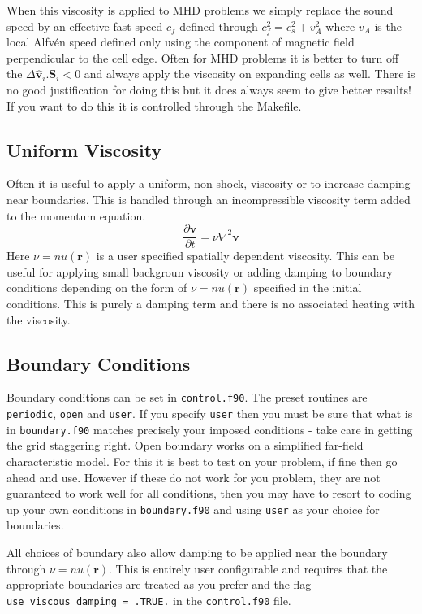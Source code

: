 \documentclass[11pt]{article}
\begin{document}
When this viscosity is applied to MHD problems we simply replace the sound speed by an effective fast speed $c_f$
defined through $c_f^2=c_s^2 + v_A^2$ where $v_A$ is the local Alfv\'en speed defined only using the component of magnetic field
perpendicular to the cell edge. Often for MHD problems it is
better to turn off the $\Delta \hat{\mathbf{v}}_i . \mathbf{S}_i<0$ and always apply the viscosity on expanding
cells as well. There is no good justification for doing this but it does always seem to give better results!
If you want to do this it is controlled through the Makefile.

\subsection{Uniform Viscosity}
Often it is useful to apply a uniform, non-shock, viscosity or to increase damping near boundaries. This is handled
through an incompressible viscosity term added to the momentum equation.
\[
\frac{\partial\mathbf{v}}{\partial t}=\nu \nabla^2 \mathbf{v}
\]
Here $\nu=nu(\mathbf{r})$ is a user specified spatially dependent viscosity. This can be useful for applying small backgroun viscosity
or adding damping to boundary conditions depending on the form of $\nu=nu(\mathbf{r})$ specified in the initial conditions.
This is purely a damping term and there is no associated heating with the viscosity.

\subsection{Boundary Conditions}
Boundary conditions can be set in {\tt control.f90}. The preset routines are {\tt periodic}, 
{\tt open} and {\tt user}. If you specify {\tt user} then you must be sure that what is in {\tt boundary.f90} matches 
precisely your imposed conditions - take care in getting the grid staggering right. Open boundary works on a 
simplified far-field characteristic model. For this it is best to test on your problem, if fine then go ahead 
and use. However if these do not work for you problem, they are not guaranteed to work well for all conditions, 
then you may have to resort to coding up your own conditions in {\tt boundary.f90} and using {\tt user} as your choice for boundaries.

All choices of boundary also allow damping to be applied near the boundary through $\nu=nu(\mathbf{r})$. 
This is entirely user configurable and 
requires that the appropriate boundaries are treated as you prefer and the flag {\tt use\_viscous\_damping = .TRUE.} in the
{\tt control.f90} file.
\end{document}
